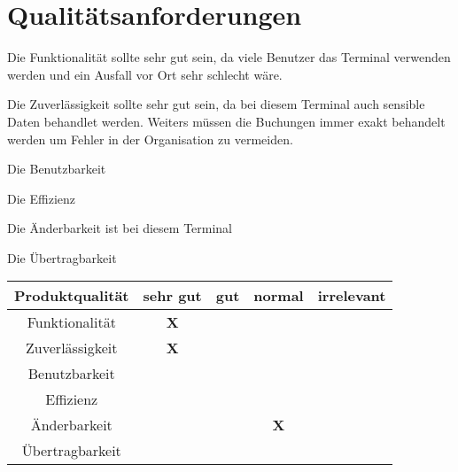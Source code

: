 
\section{Qualitätsanforderungen}
Die Funktionalität sollte sehr gut sein, da viele Benutzer das Terminal verwenden werden und ein Ausfall vor Ort sehr schlecht wäre. 

Die Zuverlässigkeit sollte sehr gut sein, da bei diesem Terminal auch sensible Daten behandlet werden. Weiters müssen die Buchungen immer exakt behandelt werden um Fehler in der Organisation zu vermeiden.

Die Benutzbarkeit

Die Effizienz

Die Änderbarkeit ist bei diesem Terminal 

Die Übertragbarkeit


\begin{center}
\begin{tabular}{ |c|c|c|c|c| } 
 \hline
 \textbf{Produktqualität} & \textbf{sehr gut} & \textbf{gut} & \textbf{normal} & \textbf{irrelevant} \\ 
 \hline
 Funktionalität & \textbf{X} &  &  &  \\ 
 \hline
 Zuverlässigkeit & \textbf{X} &   &   &  \\
 \hline
 Benutzbarkeit &  &   &   &  \\
 \hline
 Effizienz &   &   &   &  \\
 \hline
 Änderbarkeit &   &   & \textbf{X}  &  \\
 \hline
 Übertragbarkeit &   &   &   &   \\ 
 \hline
\end{tabular}
\end{center}